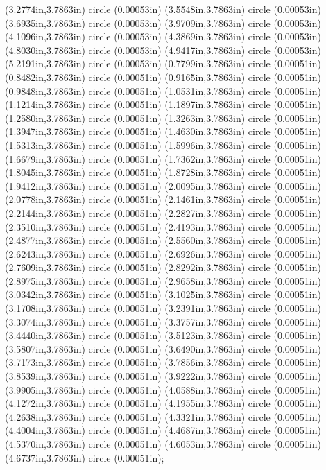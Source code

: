 (3.2774in,3.7863in) circle (0.00053in) (3.5548in,3.7863in) circle (0.00053in) (3.6935in,3.7863in) circle (0.00053in) (3.9709in,3.7863in) circle (0.00053in) (4.1096in,3.7863in) circle (0.00053in) (4.3869in,3.7863in) circle (0.00053in) (4.8030in,3.7863in) circle (0.00053in) (4.9417in,3.7863in) circle (0.00053in) (5.2191in,3.7863in) circle (0.00053in) (0.7799in,3.7863in) circle (0.00051in) (0.8482in,3.7863in) circle (0.00051in) (0.9165in,3.7863in) circle (0.00051in) (0.9848in,3.7863in) circle (0.00051in) (1.0531in,3.7863in) circle (0.00051in) (1.1214in,3.7863in) circle (0.00051in) (1.1897in,3.7863in) circle (0.00051in) (1.2580in,3.7863in) circle (0.00051in) (1.3263in,3.7863in) circle (0.00051in) (1.3947in,3.7863in) circle (0.00051in) (1.4630in,3.7863in) circle (0.00051in) (1.5313in,3.7863in) circle (0.00051in) (1.5996in,3.7863in) circle (0.00051in) (1.6679in,3.7863in) circle (0.00051in) (1.7362in,3.7863in) circle (0.00051in) (1.8045in,3.7863in) circle (0.00051in) (1.8728in,3.7863in) circle (0.00051in) (1.9412in,3.7863in) circle (0.00051in) (2.0095in,3.7863in) circle (0.00051in) (2.0778in,3.7863in) circle (0.00051in) (2.1461in,3.7863in) circle (0.00051in) (2.2144in,3.7863in) circle (0.00051in) (2.2827in,3.7863in) circle (0.00051in) (2.3510in,3.7863in) circle (0.00051in) (2.4193in,3.7863in) circle (0.00051in) (2.4877in,3.7863in) circle (0.00051in) (2.5560in,3.7863in) circle (0.00051in) (2.6243in,3.7863in) circle (0.00051in) (2.6926in,3.7863in) circle (0.00051in) (2.7609in,3.7863in) circle (0.00051in) (2.8292in,3.7863in) circle (0.00051in) (2.8975in,3.7863in) circle (0.00051in) (2.9658in,3.7863in) circle (0.00051in) (3.0342in,3.7863in) circle (0.00051in) (3.1025in,3.7863in) circle (0.00051in) (3.1708in,3.7863in) circle (0.00051in) (3.2391in,3.7863in) circle (0.00051in) (3.3074in,3.7863in) circle (0.00051in) (3.3757in,3.7863in) circle (0.00051in) (3.4440in,3.7863in) circle (0.00051in) (3.5123in,3.7863in) circle (0.00051in) (3.5807in,3.7863in) circle (0.00051in) (3.6490in,3.7863in) circle (0.00051in) (3.7173in,3.7863in) circle (0.00051in) (3.7856in,3.7863in) circle (0.00051in) (3.8539in,3.7863in) circle (0.00051in) (3.9222in,3.7863in) circle (0.00051in) (3.9905in,3.7863in) circle (0.00051in) (4.0588in,3.7863in) circle (0.00051in) (4.1272in,3.7863in) circle (0.00051in) (4.1955in,3.7863in) circle (0.00051in) (4.2638in,3.7863in) circle (0.00051in) (4.3321in,3.7863in) circle (0.00051in) (4.4004in,3.7863in) circle (0.00051in) (4.4687in,3.7863in) circle (0.00051in) (4.5370in,3.7863in) circle (0.00051in) (4.6053in,3.7863in) circle (0.00051in) (4.6737in,3.7863in) circle (0.00051in);
